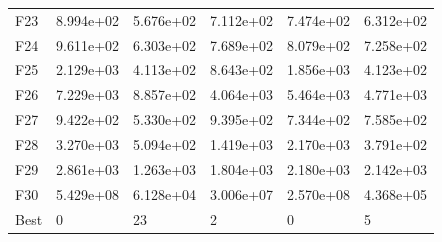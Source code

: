 \begin{tabular}{llllll}
F23  &  8.994e+02 &  5.676e+02 &  7.112e+02 &  7.474e+02 &  6.312e+02 \\
F24  &  9.611e+02 &  6.303e+02 &  7.689e+02 &  8.079e+02 &  7.258e+02 \\
F25  &  2.129e+03 &  4.113e+02 &  8.643e+02 &  1.856e+03 &  4.123e+02 \\
F26  &  7.229e+03 &  8.857e+02 &  4.064e+03 &  5.464e+03 &  4.771e+03 \\
F27  &  9.422e+02 &  5.330e+02 &  9.395e+02 &  7.344e+02 &  7.585e+02 \\
F28  &  3.270e+03 &  5.094e+02 &  1.419e+03 &  2.170e+03 &  3.791e+02 \\
F29  &  2.861e+03 &  1.263e+03 &  1.804e+03 &  2.180e+03 &  2.142e+03 \\
F30  &  5.429e+08 &  6.128e+04 &  3.006e+07 &  2.570e+08 &  4.368e+05 \\
Best &          0 &         23 &          2 &          0 &          5 \\
\bottomrule
\end{tabular}
